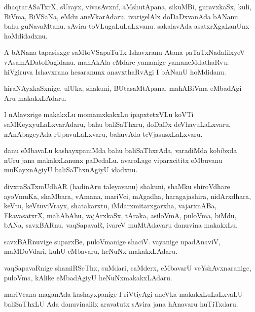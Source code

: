 \documentclass{article}
\begin{document}
\begin{mn}%
dhaqtarASaTxrX, sUrayx, vivasAvxnf, aMshutApana, sikuMBi, guravxkaSx,
kuli, BiVma, BiVSaNa, eMdu aneVkarAdaru. ivarigelAlx doDaDxvanAda
bANanu bahu guNavaMtanu. sAvira toVLugaLuLaLxvanu. sakalavAda
asatxrXgaLanUnx hoMdidadxnu. 
\end{mn}

\begin{mn}
A bANana tapasisxge saMtoVSapaTuTx Ishavxranu Atana paTaTxNadalilxyeV
vAsamADatoDagidanu. mahAkAla eMdare yamanige
yamaneMdathaRvu. hiVgiruva Ishavxrana hesaranunx anavxthaRvAgi I
bANanU hoMdidanu.
\end{mn}

\begin{mn}%
hiraNAyxkaSxnige, ulUka, shakuni, BUtasaMtApana, mahABiVma eMbadAgi
Aru makakxLAdaru.
\end{mn}

\begin{mn}
I nAlavxrige makakxLu momamxkakxLu ipapxtetxVLu koVTi
saMKeyxyuLaLxvarAdaru, bahu baliSaThxru, doDaDx deVhavuLaLxvaru,
nAnAbageyAda rUpavuLaLxvaru, bahuvAda teVjasusxLaLxvaru.
\end{mn}

\begin{mn}
danu eMbavaLu kashayxpaniMda bahu baliSaThxrAda, varadiMda kobibxda
nUru jana makakxLanunx paDedaLu. avaroLage viparxcititx eMbuvanu
muKayxnAgiyU baliSaThxnAgiyU idadxnu.
\end{mn}

\begin{mn}%
divxraSaTxmUdhAR (hadinAru taleyavanu) shakuni, shaMku shiroVdhare
ayoVmuKa, shaMbara, vAmana, mariVci, mAgadha, haragajashira,
nidArxdhara, keVtu, keVtuviVrayx, shatakarxtu, iMdarxmitarxgarxha,
vajarxnABa, EkavasatxrX, mahAbAhu, vajArxkaSx, tAraka, asiloVmA,
puloVma, biMdu, bANa, savxBARnu, vaqSapavaR, ivareV muMtAdavaru
danuvina makakxLu.
\end{mn}

\begin{mn}
savxBARnuvige suparxBe, puloVmanige shaciV. vayanige upadAnaviV,
maMDoVdari, kuhU eMbavaru, heNuNx makakxLAdaru.
\end{mn}

\begin{mn}
vaqSapavaRnige shamiRSeThx, suMdari, caMderx, eMbavarU
veYshAvxnaranige, puloVma, kAlike eMbadAgiyU heNuNxmakakxLAdaru.
\end{mn}

\begin{mn}
mariVcana maganAda kashayxpanige I riVtiyAgi aneVka makakxLuLaLxvaLU
baliSaThxLU Ada danuvinalilx aravatutx sAvira jana hAnavaru huTiTxdaru.
\end{mn}
\end{document}
